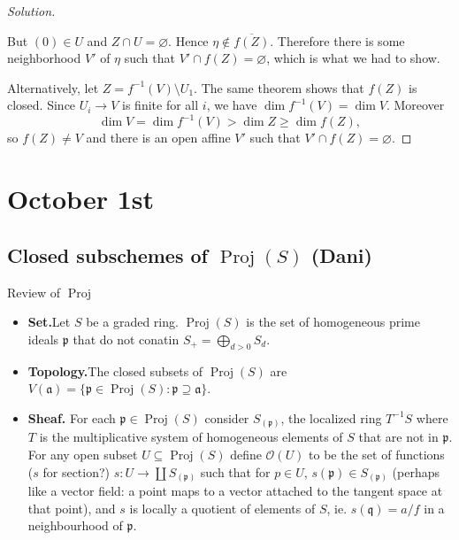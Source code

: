 \begin{proof}[Solution]
\begin{thm}[Cohen]\leavevmode
	
\end{thm}

But $(0) \in U$ and $Z \cap U = \varnothing$. Hence $\eta \not \in \overline{f(Z)}$.
Therefore there is some neighborhood $V'$ of $\eta$ such that $V' \cap f(Z) = \varnothing$, which is what we had to show.

Alternatively, let $Z = f^{-1}(V) \setminus U_1$. The same theorem shows that $f(Z)$ is closed. Since $U_i \to V$ is finite for all $i$, we have $\dim f^{-1}(V) = \dim V$. Moreover
\begin{equation*}
	\dim V = \dim f^{-1}(V) > \dim Z \geq \dim f(Z),
\end{equation*}
so $f(Z) \ne V$ and there is an open affine $V'$ such that $V' \cap f(Z) = \varnothing$.
\end{proof}

\section{October 1st}

\subsection{Closed subschemes of $\operatorname{Proj}(S)$ (Dani)}

\begin{thing6}{Review of $\operatorname{Proj}$}\leavevmode
	\begin{itemize}
	\item {\color{2}\bfseries Set.}\hspace{.5em}Let $S$ be a graded ring. $\operatorname{Proj}(S)$ is the set of homogeneous prime ideals $\mathfrak{p}$ that do not conatin $S_+=\bigoplus_{d>0}S_d$.
	\item {\color{2}\bfseries Topology.}\hspace{.5em}The closed subsets of $\operatorname{Proj}(S)$ are $V(\mathfrak{a})=\{\mathfrak{p}\in\operatorname{Proj}(S):\mathfrak{p}\supseteq\mathfrak{a}\}$.
	\item {\color{2}\bfseries Sheaf.}\hspace{.5em} For each $\mathfrak{p}\in\operatorname{Proj}(S)$ consider $S_{(\mathfrak{p})}$, the localized ring $T^{-1}S$ where $T$ is the multiplicative system of homogeneous elements of $S$ that are not in $\mathfrak{p}$. For any open subset $U \subseteq \operatorname{Proj}(S)$ define $\mathcal{O}(U)$ to be the set of functions ($s$ for section?) $s:U\to \coprod S_{(\mathfrak{p})}$ such that for $ p \in U$, $s(\mathfrak{p})\in S_{(\mathfrak{p})}$ (perhaps like a vector field: a point maps to a vector attached to the tangent space at that point), and $s$ is locally a quotient of elements of $S$, ie. $s(\mathfrak{q})=a/f$ in a neighbourhood of $\mathfrak{p}$.
	\end{itemize}
\end{thing6}

